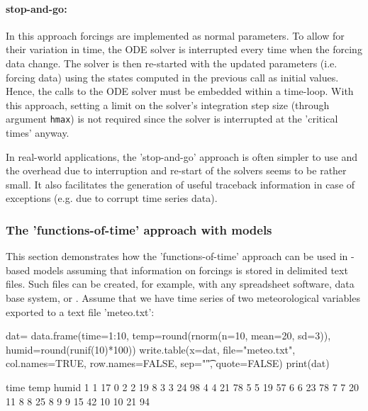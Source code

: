 \documentclass[times,onecolumn]{article}
\begin{document}
\paragraph{stop-and-go:} In this approach forcings are implemented as normal parameters. To allow for their variation in time, the ODE solver is interrupted every time when the forcing data change. The solver is then re-started with the updated parameters (i.e. forcing data) using the states computed in the previous call as initial values. Hence, the calls to the ODE solver must be embedded within a time-loop. With this approach, setting a limit on the solver's integration step size (through argument \verb|hmax|) is not required since the solver is interrupted at the 'critical times' anyway.

In real-world applications, the 'stop-and-go' approach is often simpler to use and the overhead due to interruption and re-start of the solvers seems to be rather small. It also facilitates the generation of useful traceback information in case of exceptions (e.g. due to corrupt time series data).

\subsubsection{The 'functions-of-time' approach with  models}

This section demonstrates how the 'functions-of-time' approach can be used in -based models assuming that information on forcings is stored in delimited text files. Such files can be created, for example, with any spreadsheet software, data base system, or . Assume that we have time series of two meteorological variables exported to a text file 'meteo.txt':

\begin{Schunk}
\begin{Sinput}
 dat= data.frame(time=1:10, temp=round(rnorm(n=10, mean=20, sd=3)),
   humid=round(runif(10)*100))
 write.table(x=dat, file="meteo.txt", col.names=TRUE,
   row.names=FALSE, sep="\t", quote=FALSE)
 print(dat)
\end{Sinput}
\begin{Soutput}
   time temp humid
1     1   17     0
2     2   19     8
3     3   24    98
4     4   21    78
5     5   19    57
6     6   23    78
7     7   20    11
8     8   25     8
9     9   15    42
10   10   21    94
\end{Soutput}
\end{Schunk}
\end{document}
